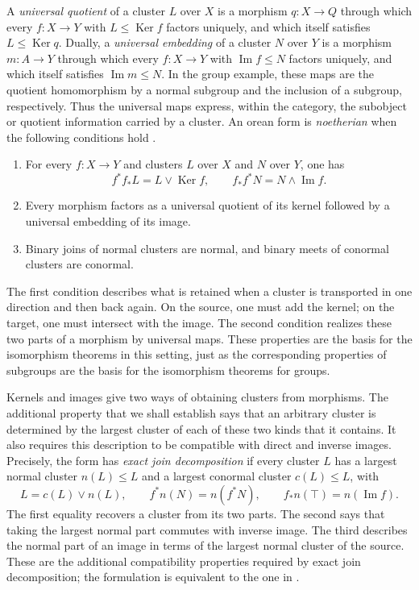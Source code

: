 \documentclass[11pt,a4paper]{article}
\theoremstyle{plain}
\theoremstyle{definition}
\theoremstyle{remark}
\begin{document}
A \emph{universal quotient} of a cluster $L$ over $X$ is a
morphism $q:X\to Q$ through which every $f:X\to Y$ with
$L\le\operatorname{Ker}f$ factors uniquely, and which itself
satisfies $L\le\operatorname{Ker}q$. Dually, a
\emph{universal embedding} of a cluster $N$ over $Y$ is a
morphism $m:A\to Y$ through which every $f:X\to Y$ with
$\operatorname{Im}f\le N$ factors uniquely, and which itself
satisfies $\operatorname{Im}m\le N$.
In the group example, these maps are the quotient homomorphism
by a normal subgroup and the inclusion of a subgroup, respectively.
Thus the universal maps express, within the category, the
subobject or quotient information carried by a cluster.
An orean form is \emph{noetherian} when the following conditions
hold \cite[Definition 48]{JanelidzeVanNiekerk}.
\begin{enumerate}
\item For every $f:X\to Y$ and clusters $L$ over $X$ and
$N$ over $Y$, one has
\[
 f^*f_*L=L\vee\operatorname{Ker}f,\qquad
 f_*f^*N=N\wedge\operatorname{Im}f.
\]
\item Every morphism factors as a universal quotient of its
kernel followed by a universal embedding of its image.
\item Binary joins of normal clusters are normal, and binary
meets of conormal clusters are conormal.
\end{enumerate}
The first condition describes what is retained when a cluster is
transported in one direction and then back again. On the source,
one must add the kernel; on the target, one must intersect with
the image. The second condition realizes these two parts of a
morphism by universal maps. These properties are the basis for
the isomorphism theorems in this setting, just as the corresponding
properties of subgroups are the basis for the isomorphism
theorems for groups.

Kernels and images give two ways of obtaining clusters from
morphisms. The additional property that we shall establish says
that an arbitrary cluster is determined by the largest cluster
of each of these two kinds that it contains. It also requires
this description to be compatible with direct and inverse images.
\label{not:normal-conormal-parts}
Precisely, the form has \emph{exact join decomposition} if every cluster
$L$ has a largest normal cluster $n(L)\le L$ and a largest
conormal cluster $c(L)\le L$, with
\[
 L=c(L)\vee n(L),\qquad
 f^*n(N)=n(f^*N),\qquad
 f_*n(\top)=n(\operatorname{Im}f).
\]
The first equality recovers a cluster from its two parts. The
second says that taking the largest normal part commutes with
inverse image. The third describes the normal part of an image
in terms of the largest normal cluster of the source. These are
the additional compatibility properties required by exact join
decomposition; the formulation is equivalent to the one in
\cite[Theorem 140]{JanelidzeVanNiekerk}.
\end{document}
